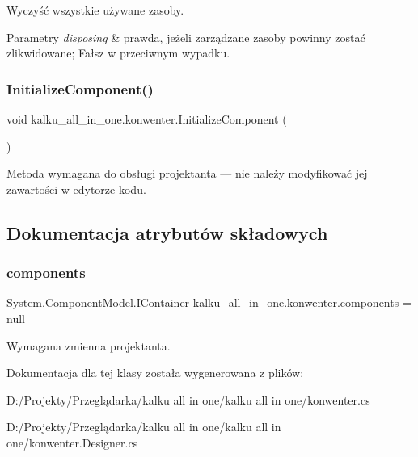 Wyczyść wszystkie używane zasoby. 


\begin{DoxyParams}{Parametry}
{\em disposing} & prawda, jeżeli zarządzane zasoby powinny zostać zlikwidowane; Fałsz w przeciwnym wypadku.\\
\hline
\end{DoxyParams}
\mbox{\label{classkalku__all__in__one_1_1konwenter_a4cac899b93cc3b33e6fddc25f67d4e9f}} 
\subsubsection{\texorpdfstring{InitializeComponent()}{InitializeComponent()}}
{\footnotesize\ttfamily void kalku\+\_\+all\+\_\+in\+\_\+one.\+konwenter.\+Initialize\+Component (\begin{DoxyParamCaption}{ }\end{DoxyParamCaption})\hspace{0.3cm}{\ttfamily [private]}}



Metoda wymagana do obsługi projektanta — nie należy modyfikować jej zawartości w edytorze kodu. 



\subsection{Dokumentacja atrybutów składowych}
\mbox{\label{classkalku__all__in__one_1_1konwenter_a406b6efe79f830bd77c75f2fef0dbc5c}} 
\subsubsection{\texorpdfstring{components}{components}}
{\footnotesize\ttfamily System.\+Component\+Model.\+I\+Container kalku\+\_\+all\+\_\+in\+\_\+one.\+konwenter.\+components = null\hspace{0.3cm}{\ttfamily [private]}}



Wymagana zmienna projektanta. 



Dokumentacja dla tej klasy została wygenerowana z plików\+:\begin{DoxyCompactItemize}
\item 
D\+:/\+Projekty/\+Przeglądarka/kalku all in one/kalku all in one/konwenter.\+cs\item 
D\+:/\+Projekty/\+Przeglądarka/kalku all in one/kalku all in one/konwenter.\+Designer.\+cs\end{DoxyCompactItemize}

